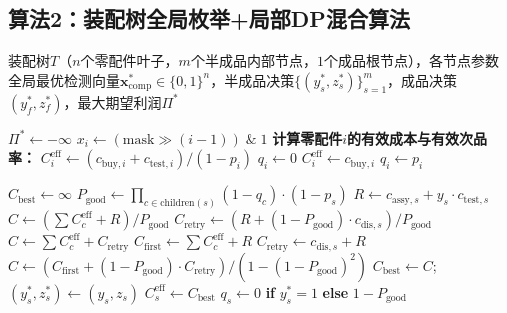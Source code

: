 \documentclass[12pt,a4paper]{ctexart}
\begin{document}
\subsection{算法2：装配树全局枚举+局部DP混合算法}

\begin{algorithm}[H]
\caption{装配树全局优化（问题3）}
\begin{algorithmic}[1]
\Require 装配树$T$（$n$个零配件叶子，$m$个半成品内部节点，$1$个成品根节点），各节点参数
\Ensure 全局最优检测向量$\mathbf{x}^*_{\text{comp}} \in \{0,1\}^n$，半成品决策$\{(y_s^*, z_s^*)\}_{s=1}^m$，成品决策$(y_f^*, z_f^*)$，最大期望利润$\Pi^*$

\State $\Pi^* \leftarrow -\infty$
 
        \State $x_i \leftarrow (\text{mask} \gg (i-1)) \;\&\; 1$
        \State \textbf{计算零配件$i$的有效成本与有效次品率：}
         
            \State $C_i^{\text{eff}} \leftarrow (c_{\text{buy},i} + c_{\text{test},i}) / (1-p_i)$
            \State $q_i \leftarrow 0$
        \Else {}
            \State $C_i^{\text{eff}} \leftarrow c_{\text{buy},i}$
            \State $q_i \leftarrow p_i$
        \EndIf
    \EndFor

     
        \State $C_{\text{best}} \leftarrow \infty$
         
            \State $P_{\text{good}} \leftarrow \prod_{c \in \text{children}(s)}(1 - q_c) \cdot (1 - p_s)$
            \State $R \leftarrow c_{\text{assy},s} + y_s \cdot c_{\text{test},s}$
             
                \State $C \leftarrow (\sum C_c^{\text{eff}} + R) / P_{\text{good}}$
            \Else {}
                 
                    \State $C_{\text{retry}} \leftarrow (R + (1-P_{\text{good}})\cdot c_{\text{dis},s}) / P_{\text{good}}$
                    \State $C \leftarrow \sum C_c^{\text{eff}} + C_{\text{retry}}$
                \Else {}
                    \State $C_{\text{first}} \leftarrow \sum C_c^{\text{eff}} + R$
                    \State $C_{\text{retry}} \leftarrow c_{\text{dis},s} + R$
                    \State $C \leftarrow (C_{\text{first}} + (1-P_{\text{good}}) \cdot C_{\text{retry}}) / (1-(1-P_{\text{good}})^2)$
                \EndIf
            \EndIf
                \State $C_{\text{best}} \leftarrow C$; $(y_s^*, z_s^*) \leftarrow (y_s, z_s)$
            \EndIf
        \EndFor
        \State $C_s^{\text{eff}} \leftarrow C_{\text{best}}$
        \State $q_s \leftarrow 0$ \textbf{if} $y_s^*=1$ \textbf{else} $1-P_{\text{good}}$
    \EndFor


\end{algorithmic}
\end{algorithm}
\end{document}
